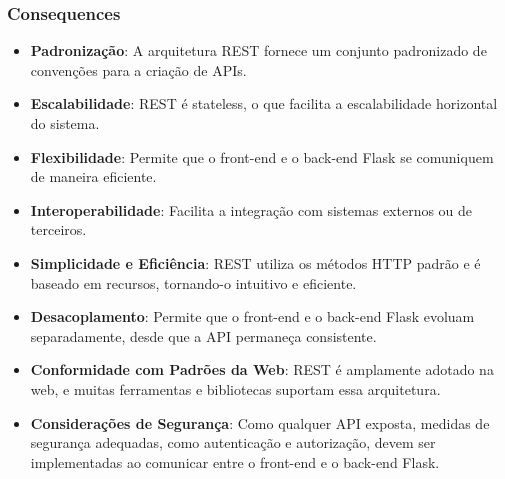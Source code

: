 \subsubsection*{Consequences}
\begin{itemize}
	\item \textbf{Padronização}: A arquitetura REST fornece um conjunto padronizado de convenções para a criação de APIs.
	\item \textbf{Escalabilidade}: REST é stateless, o que facilita a escalabilidade horizontal do sistema.
	\item \textbf{Flexibilidade}: Permite que o front-end e o back-end Flask se comuniquem de maneira eficiente.
	\item \textbf{Interoperabilidade}: Facilita a integração com sistemas externos ou de terceiros.
	\item \textbf{Simplicidade e Eficiência}: REST utiliza os métodos HTTP padrão e é baseado em recursos, tornando-o intuitivo e eficiente.
	\item \textbf{Desacoplamento}: Permite que o front-end e o back-end Flask evoluam separadamente, desde que a API permaneça consistente.
	\item \textbf{Conformidade com Padrões da Web}: REST é amplamente adotado na web, e muitas ferramentas e bibliotecas suportam essa arquitetura.
	\item \textbf{Considerações de Segurança}: Como qualquer API exposta, medidas de segurança adequadas, como autenticação e autorização, devem ser implementadas ao comunicar entre o front-end e o back-end Flask.
\end{itemize}

